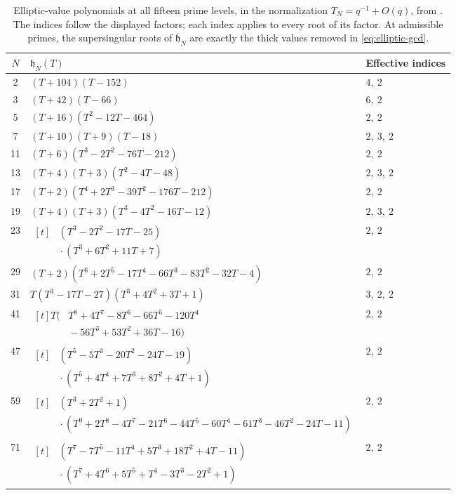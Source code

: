 \documentclass[11pt,a4paper]{article}
\numberwithin{equation}{section}
\theoremstyle{definition}
\theoremstyle{remark}
\begin{document}
\begin{table}[p]\centering\small
\setlength{\tabcolsep}{4pt}
\begin{tabular}{cll}\toprule
$N$ & $\mathfrak h_N(T)$ & Effective indices\\\midrule
2 & $(T+104)(T-152)$ & $4,\ 2$\\[3pt]
3 & $(T+42)(T-66)$ & $6,\ 2$\\[3pt]
5 & $(T+16)(T^{2}-12T-464)$ & $2,\ 2$\\[3pt]
7 & $(T+10)(T+9)(T-18)$ & $2,\ 3,\ 2$\\[3pt]
11 & $(T+6)(T^{3}-2T^{2}-76T-212)$ & $2,\ 2$\\[3pt]
13 & $(T+4)(T+3)(T^{2}-4T-48)$ & $2,\ 3,\ 2$\\[3pt]
17 & $(T+2)(T^{4}+2T^{3}-39T^{2}-176T-212)$ & $2,\ 2$\\[3pt]
19 & $(T+4)(T+3)(T^{3}-4T^{2}-16T-12)$ & $2,\ 3,\ 2$\\[3pt]
23 & $\begin{aligned}[t]&(T^{3}-2T^{2}-17T-25)\\[-1pt]&{}\cdot(T^{3}+6T^{2}+11T+7)\end{aligned}$ & $2,\ 2$\\[3pt]
29 & $(T+2)(T^{6}+2T^{5}-17T^{4}-66T^{3}-83T^{2}-32T-4)$ & $2,\ 2$\\[3pt]
31 & $T(T^{3}-17T-27)(T^{3}+4T^{2}+3T+1)$ & $3,\ 2,\ 2$\\[3pt]
41 & $\begin{aligned}[t]T\bigl(&T^8+4T^7-8T^6-66T^5-120T^4\\[-1pt]&{}-56T^3+53T^2+36T-16\bigr)\end{aligned}$ & $2,\ 2$\\[3pt]
47 & $\begin{aligned}[t]&(T^{5}-5T^{3}-20T^{2}-24T-19)\\[-1pt]&{}\cdot(T^{5}+4T^{4}+7T^{3}+8T^{2}+4T+1)\end{aligned}$ & $2,\ 2$\\[3pt]
59 & $\begin{aligned}[t]&(T^{3}+2T^{2}+1)\\[-1pt]&{}\cdot(T^{9}+2T^{8}-4T^{7}-21T^{6}-44T^{5}-60T^{4}-61T^{3}-46T^{2}-24T-11)\end{aligned}$ & $2,\ 2$\\[3pt]
71 & $\begin{aligned}[t]&(T^{7}-7T^{5}-11T^{4}+5T^{3}+18T^{2}+4T-11)\\[-1pt]&{}\cdot(T^{7}+4T^{6}+5T^{5}+T^{4}-3T^{3}-2T^{2}+1)\end{aligned}$ & $2,\ 2$\\[3pt]
\bottomrule\end{tabular}
\caption{Elliptic-value polynomials at all fifteen prime levels, in the
normalization $T_N=q^{-1}+O(q)$, from \citet[\S4.2, Table~1]{JST19}.
The indices follow the displayed factors; each index applies to every root
of its factor. At admissible primes, the supersingular roots of
$\overline{\mathfrak h}_N$ are exactly the thick values removed in
\eqref{eq:elliptic-gcd}.}
\label{tab:elliptic-values}
\end{table}
\end{document}
